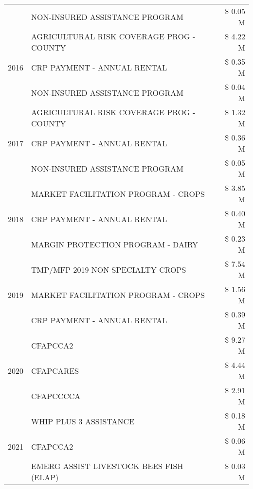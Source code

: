 \begin{tabular}{llr}
 & NON-INSURED ASSISTANCE PROGRAM & \$ 0.05 M \\
\cline{1-3}
\multirow[t]{3}{*}{2016} & AGRICULTURAL RISK COVERAGE PROG - COUNTY & \$ 4.22 M \\
 & CRP PAYMENT - ANNUAL RENTAL & \$ 0.35 M \\
 & NON-INSURED ASSISTANCE PROGRAM & \$ 0.04 M \\
\cline{1-3}
\multirow[t]{3}{*}{2017} & AGRICULTURAL RISK COVERAGE PROG - COUNTY & \$ 1.32 M \\
 & CRP PAYMENT - ANNUAL RENTAL & \$ 0.36 M \\
 & NON-INSURED ASSISTANCE PROGRAM & \$ 0.05 M \\
\cline{1-3}
\multirow[t]{3}{*}{2018} & MARKET FACILITATION PROGRAM - CROPS & \$ 3.85 M \\
 & CRP PAYMENT - ANNUAL RENTAL & \$ 0.40 M \\
 & MARGIN PROTECTION PROGRAM - DAIRY & \$ 0.23 M \\
\cline{1-3}
\multirow[t]{3}{*}{2019} & TMP/MFP 2019 NON SPECIALTY CROPS & \$ 7.54 M \\
 & MARKET FACILITATION PROGRAM - CROPS & \$ 1.56 M \\
 & CRP PAYMENT - ANNUAL RENTAL & \$ 0.39 M \\
\cline{1-3}
\multirow[t]{3}{*}{2020} & CFAPCCA2 & \$ 9.27 M \\
 & CFAPCARES & \$ 4.44 M \\
 & CFAPCCCCA & \$ 2.91 M \\
\cline{1-3}
\multirow[t]{3}{*}{2021} & WHIP PLUS 3 ASSISTANCE & \$ 0.18 M \\
 & CFAPCCA2 & \$ 0.06 M \\
 & EMERG ASSIST LIVESTOCK BEES FISH (ELAP) & \$ 0.03 M \\
\cline{1-3}
\bottomrule
\end{tabular}
